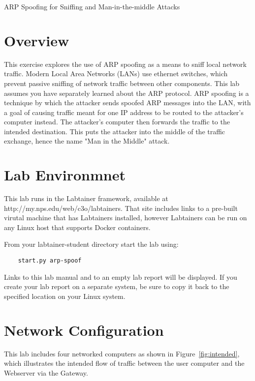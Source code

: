 


\begin{center}
{\LARGE ARP Spoofing for Sniffing and Man-in-the-middle Attacks}
\vspace{0.1in}\\
\end{center}

\copyrightnotice

\section{Overview}
This exercise explores the use of ARP spoofing as a means to
sniff local network traffic.  Modern Local Area Networks (LANs)
use ethernet switches, which prevent passive sniffing of network
traffic between other components.  This lab assumes you have
separately learned about the ARP protocol.  ARP spoofing is
a technique by which the attacker sends spoofed ARP messages
into the LAN, with a goal of causing traffic meant for one IP
address to be routed to the attacker's computer instead.  The
attacker's computer then forwards the traffic to the intended
destination.  This puts the attacker into the middle of the
traffic exchange, hence the name "Man in the Middle" attack.

\section{Lab Environmnet}
This lab runs in the Labtainer framework,
available at http://my.nps.edu/web/c3o/labtainers.
That site includes links to a pre-built virutal machine
that has Labtainers installed, however Labtainers can
be run on any Linux host that supports Docker containers.

From your labtainer-student directory start the lab using:
\begin{verbatim}
    start.py arp-spoof
\end{verbatim}
Links to this lab manual and to an empty lab report will be displayed.  If you create your lab report on a separate system, 
be sure to copy it back to the specified location on your Linux system.


\section{Network Configuration}
This lab includes four networked computers as shown in Figure~\ref{fig:intended},
which illustrates the intended flow of traffic between the user computer and
the Webserver via the Gateway.  

